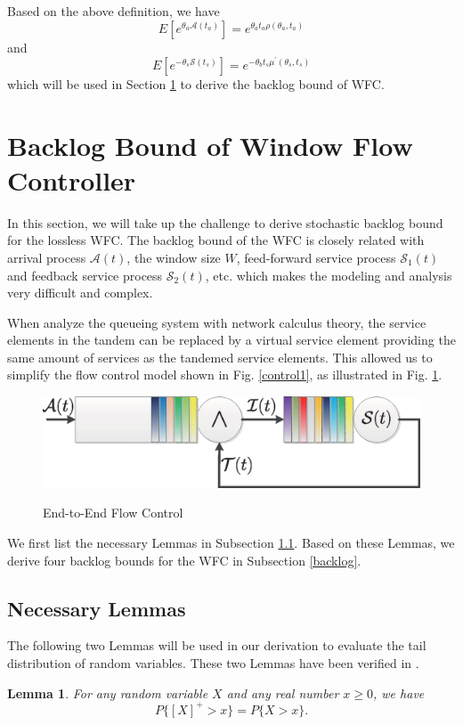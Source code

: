 \documentclass[12pt]{article}
\newtheorem{lemma}{Lemma}
\begin{document}
Based on the above definition, we have
$$E[e^{\theta_a \mathcal{A}(t_a)}]=e^{\theta_a t_a\rho(\theta_a,t_a)}$$
and
$$E[e^{-\theta_s \mathcal{S}(t_s)}]=e^{-\theta_b t_s\mu^\prime(\theta_s,t_s)}$$
which will be used in Section \ref{sncloss} to derive the backlog bound of WFC.

\section{Backlog Bound of Window Flow Controller}\label{sncloss}
In this section, we will take up the challenge to derive stochastic backlog bound for the lossless WFC. The backlog bound of the WFC is closely related with arrival process $\mathcal{A}(t)$, the window size $W$, feed-forward service process $\mathcal{S}_1(t)$ and feedback service process $\mathcal{S}_2(t)$, etc. which makes the modeling and analysis very difficult and complex.

When analyze the queueing system with network calculus theory, the service elements in the tandem can be replaced by a virtual service element providing the same amount of services as the tandemed service elements. This allowed us to simplify the flow control model shown in Fig. \ref{control1}, as illustrated in Fig. \ref{control2}.
\begin{figure}[ht]
  \centering\includegraphics[scale=0.45]{figures/QueueModel2.eps}\\
  \caption{End-to-End Flow Control}\label{control2}
\end{figure}

We first list the necessary Lemmas in Subsection \ref{neclemma}. Based on these Lemmas, we derive four backlog bounds for the WFC in Subsection \ref{backlog}.
\subsection{Necessary Lemmas}\label{neclemma}
The following two Lemmas will be used in our derivation to evaluate the tail distribution of random variables. These two Lemmas have been verified in \cite{jiang2006basic}.
\begin{lemma}\label{lamma1}
For any random variable $X$ and any real number $x\geq 0$, we have $$P\{[X]^+>x\}=P\{X>x\}.$$
\end{lemma}
\end{document}
